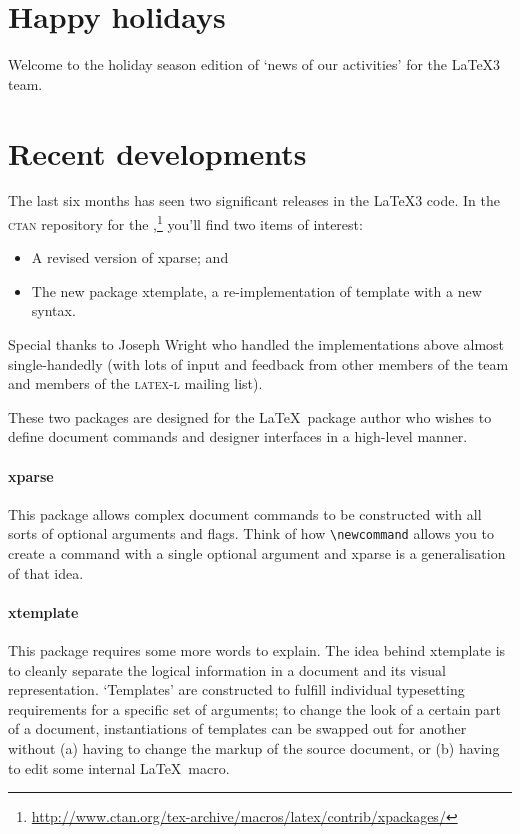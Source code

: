 \documentclass{ltnews}
\begin{document}
\maketitle
\raisefirstsection

\section{Happy holidays}

Welcome to the holiday season edition of `news of our activities' for the \LaTeX3 team.

\section{Recent developments}

The last six months has seen two significant releases in the \LaTeX3 code.
In the \textsc{ctan} repository for the ,\footnote{\url{http://www.ctan.org/tex-archive/macros/latex/contrib/xpackages/}} you'll find two items of interest:
\begin{itemize}
\item A revised version of \textsf{xparse}; and
\item The new package \textsf{xtemplate}, a re-implementation of \textsf{template} with a new syntax.
\end{itemize}
Special thanks to Joseph Wright who handled the implementations above almost single-handedly (with lots of input and feedback from other members of the team and members of the \textsc{latex-l} mailing list).

These two packages are designed for the \LaTeX\ package author who wishes to define document commands and designer interfaces in a high-level manner.

\paragraph{\textsf{xparse}}
This package allows complex document commands to be constructed with all sorts of optional arguments and flags. Think of how \verb|\newcommand| allows you to create a command with a single optional argument and \textsf{xparse} is a generalisation of that idea.

\paragraph{\textsf{xtemplate}}
This package requires some more words to explain. The idea behind
\textsf{xtemplate} is to cleanly separate the logical information in a
document and its visual representation. `Templates' are constructed to fulfill
individual typesetting requirements for a specific set of arguments; to change
the look of a certain part of a document, instantiations of templates can be
swapped out for another without (a) having to change the markup of the source
document, or (b) having to edit some internal \LaTeX\ macro.
\end{document}
